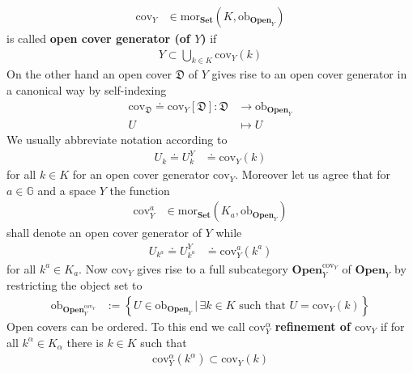 \begin{exa}
\begin{enumerate}
\begin{align*}
  \mathrm{cov}_{Y}
  &\in
  \mathrm{mor}_{\mathbf{Set}}
  \left(
    K,
    \mathrm{ob}_{\mathbf{Open}_{Y}}
  \right)
\end{align*}
is called \textbf{open cover generator (of $Y$)} if
\begin{align*}
  Y
  \subset
  \bigcup_{k \in K}
  \mathrm{cov}_{Y}(k)
\end{align*}
On the other hand an open cover $\mathfrak{D}$ of $Y$ gives rise to an open cover generator in a canonical way by self-indexing
\begin{align*}
  \mathrm{cov}_{\mathfrak{D}}
  \doteq
  \mathrm{cov}_{Y}[\mathfrak{D}]
  \colon
  \mathfrak{D}
  &\rightarrow
  \mathrm{ob}_{\mathbf{Open}_{Y}}
  \\
  U
  &\mapsto
  U
\end{align*}
We usually abbreviate notation according to
\begin{align*}
  U_{k}
  \doteq
  U_{k}^{Y}
  &\doteq
  \mathrm{cov}_{Y}(k)
\end{align*}
for all $k \in K$ for an open cover generator $\mathrm{cov}_{Y}$. Moreover let us agree that for $a \in \mathbb{G}$ and a space $Y$ the function
\begin{align*}
  \mathrm{cov}_{Y}^{a}
  &\in
  \mathrm{mor}_{\mathbf{Set}}
  \left(
    K_{a},
    \mathrm{ob}_{\mathbf{Open}_{Y}}
  \right)
\end{align*}
shall denote an open cover generator of $Y$ while
\begin{align*}
  U_{k^{a}}
  \doteq
  U_{k^{a}}^{Y}
  &\doteq
  \mathrm{cov}_{Y}^{a}(k^{a})
\end{align*}
for all $k^{a} \in K_{a}$. Now $\mathrm{cov}_{Y}$ gives rise to a full subcategory $\mathbf{Open}_{Y}^{\mathrm{cov}_{Y}}$ of $\mathbf{Open}_{Y}$ by restricting the object set to
\begin{align*}
  \mathrm{ob}_{\mathbf{Open}_{Y}^{\mathrm{cov}_{Y}}}
  &:=
  \left\lbrace
      U
      \in
      \mathrm{ob}_{\mathbf{Open}_{Y}}
    \,
    \vert
    \,
      \exists
      k
      \in
      K
      \text{ such that }
      U
      =
      \mathrm{cov}_{Y}(k)
  \right\rbrace
\end{align*}
Open covers can be ordered. To this end we call $\mathrm{cov}_{Y}^{\alpha}$ \textbf{refinement of $\mathrm{cov}_{Y}$} if for all $k^{\alpha} \in K_{\alpha}$ there is $k \in K$ such that
\begin{align*}
  \mathrm{cov}_{Y}^{\alpha}
  \left(
    k^{\alpha}
  \right)
  \subset
  \mathrm{cov}_{Y}(k)

\end{align*}
\end{enumerate}
\end{exa}
